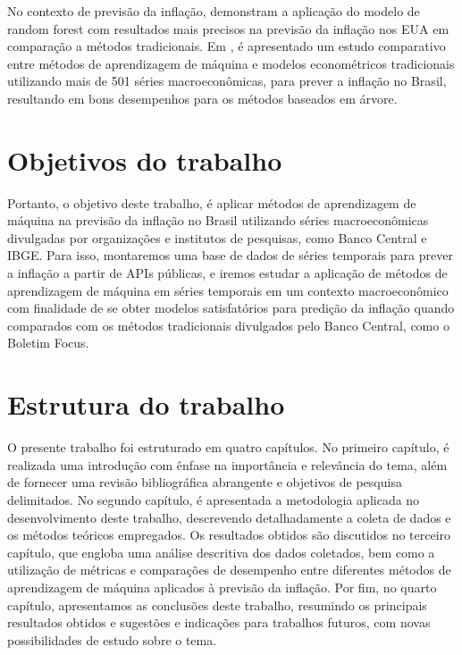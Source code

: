 No contexto de previsão da inflação,  demonstram a aplicação do modelo de random forest com resultados mais precisos na previsão da inflação nos EUA em comparação a métodos tradicionais. Em , é apresentado um estudo comparativo entre métodos de aprendizagem de máquina e modelos econométricos tradicionais utilizando mais de 501 séries macroeconômicas, para prever a inflação no Brasil, resultando em bons desempenhos para os métodos baseados em árvore.

\section{Objetivos do trabalho}\label{sec-objetivos}

Portanto, o objetivo deste trabalho, é aplicar métodos de aprendizagem de máquina na previsão da inflação no Brasil utilizando séries macroeconômicas divulgadas por organizações e institutos de pesquisas, como Banco Central e IBGE. Para isso, montaremos uma base de dados de séries temporais para prever a inflação a partir de APIs públicas, e iremos estudar a aplicação de métodos de aprendizagem de máquina em séries temporais em um contexto macroeconômico com finalidade de se obter modelos satisfatórios para predição da inflação quando comparados com os métodos tradicionais divulgados pelo Banco Central, como o Boletim Focus.

\section{Estrutura do trabalho}\label{sec-estrutura}

O presente trabalho foi estruturado em quatro capítulos. No primeiro capítulo, é realizada uma introdução com ênfase na importância e relevância do tema, além de fornecer uma revisão bibliográfica abrangente e objetivos de pesquisa delimitados. No segundo capítulo, é apresentada a metodologia aplicada no desenvolvimento deste trabalho, descrevendo detalhadamente a coleta de dados e os métodos teóricos empregados. Os resultados obtidos são discutidos no terceiro capítulo, que engloba uma análise descritiva dos dados coletados, bem como a utilização de métricas e comparações de desempenho entre diferentes métodos de aprendizagem de máquina aplicados à previsão da inflação. Por fim, no quarto capítulo, apresentamos as conclusões deste trabalho, resumindo os principais resultados obtidos e sugestões e indicações para trabalhos futuros, com novas possibilidades de estudo sobre o tema.